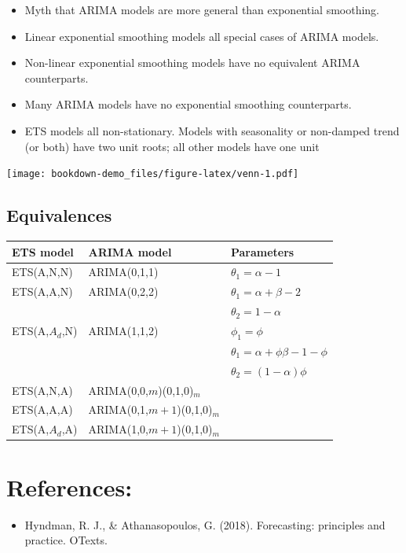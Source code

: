 \documentclass[]{book}
\providecommand{\tightlist}{%
  \setlength{\itemsep}{0pt}\setlength{\parskip}{0pt}}
\begin{document}
\begin{itemize}
\item
  Myth that ARIMA models are more general than exponential smoothing.
\item
  Linear exponential smoothing models all special cases of ARIMA models.
\item
  Non-linear exponential smoothing models have no equivalent ARIMA counterparts.
\item
  Many ARIMA models have no exponential smoothing counterparts.
\item
  ETS models all non-stationary. Models with seasonality or non-damped trend (or both) have two unit roots; all other models have one unit 
\end{itemize}

\texttt{[image: bookdown-demo\_files/figure-latex/venn-1.pdf]}

\newpage

\hypertarget{equivalences}{%
\subsection{Equivalences}\label{equivalences}}

\begin{longtable}[]{@{}lll@{}}
\toprule
\textbf{ETS model} & \textbf{ARIMA model} & \textbf{Parameters}\tabularnewline
\midrule
\endhead
ETS(A,N,N) & ARIMA(0,1,1) & \(\theta_1 = \alpha-1\)\tabularnewline
ETS(A,A,N) & ARIMA(0,2,2) & \(\theta_1 = \alpha+\beta-2\)\tabularnewline
& & \(\theta_2 = 1-\alpha\)\tabularnewline
ETS(A,\(A_d\),N) & ARIMA(1,1,2) & \(\phi_1=\phi\)\tabularnewline
& & \(\theta_1 = \alpha+\phi\beta-1-\phi\)\tabularnewline
& & \(\theta_2 = (1-\alpha)\phi\)\tabularnewline
ETS(A,N,A) & ARIMA(0,0,\(m\))(0,1,0)\(_m\) &\tabularnewline
ETS(A,A,A) & ARIMA(0,1,\(m+1\))(0,1,0)\(_m\) &\tabularnewline
ETS(A,\(A_d\),A) & ARIMA(1,0,\(m+1\))(0,1,0)\(_m\) &\tabularnewline
\bottomrule
\end{longtable}

\hypertarget{references-1}{%
\section{References:}\label{references-1}}

\begin{itemize}
\tightlist
\item
  Hyndman, R. J., \& Athanasopoulos, G. (2018). Forecasting: principles and practice. OTexts.
\end{itemize}
\end{document}
